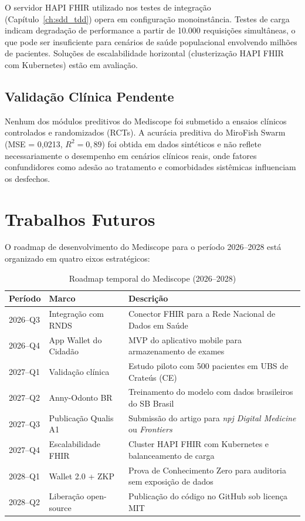 O servidor HAPI FHIR utilizado nos testes de integração (Capítulo~\ref{ch:sdd_tdd}) opera em configuração monoinstância. Testes de carga indicam degradação de performance a partir de 10.000 requisições simultâneas, o que pode ser insuficiente para cenários de saúde populacional envolvendo milhões de pacientes. Soluções de escalabilidade horizontal (clusterização HAPI FHIR com Kubernetes) estão em avaliação.

\subsection{Validação Clínica Pendente}

Nenhum dos módulos preditivos do Mediscope foi submetido a ensaios clínicos controlados e randomizados (RCTs). A acurácia preditiva do MiroFish Swarm (MSE = 0,0213, $R^2 = 0{,}89$) foi obtida em dados sintéticos e não reflete necessariamente o desempenho em cenários clínicos reais, onde fatores confundidores como adesão ao tratamento e comorbidades sistêmicas influenciam os desfechos.

\section{Trabalhos Futuros}

O roadmap de desenvolvimento do Mediscope para o período 2026--2028 está organizado em quatro eixos estratégicos:

\begin{table}[htb]
\centering
\caption{Roadmap temporal do Mediscope (2026--2028)}
\label{tab:roadmap}
\small
\begin{tabular}{lll}
\toprule
\textbf{Período} & \textbf{Marco} & \textbf{Descrição} \\
\midrule
2026--Q3 & Integração com RNDS & Conector FHIR para a Rede Nacional de Dados em Saúde \\
2026--Q4 & App Wallet do Cidadão & MVP do aplicativo mobile para armazenamento de exames \\
2027--Q1 & Validação clínica & Estudo piloto com 500 pacientes em UBS de Crateús (CE) \\
2027--Q2 & Anny-Odonto BR & Treinamento do modelo com dados brasileiros do SB Brasil \\
2027--Q3 & Publicação Qualis A1 & Submissão do artigo para \textit{npj Digital Medicine} ou \textit{Frontiers} \\
2027--Q4 & Escalabilidade FHIR & Cluster HAPI FHIR com Kubernetes e balanceamento de carga \\
2028--Q1 & Wallet 2.0 + ZKP & Prova de Conhecimento Zero para auditoria sem exposição de dados \\
2028--Q2 & Liberação open-source & Publicação do código no GitHub sob licença MIT \\
\bottomrule
\end{tabular}
\end{table}

